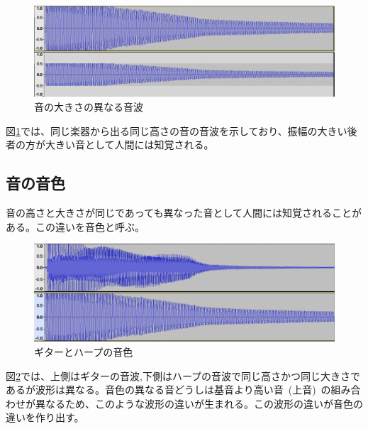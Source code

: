 \begin{figure}[t]
\begin{center}
\includegraphics[width=0.7\hsize]{figure/c4_harp_loudness.png}
\caption{音の大きさの異なる音波}
\label{fig:loudness}
\end{center}
\end{figure}

図\ref{fig:loudness}では、同じ楽器から出る同じ高さの音の音波を示しており、振幅の大きい後者の方が大きい音として人間には知覚される。

\subsection{音の音色}

音の高さと大きさが同じであっても異なった音として人間には知覚されることがある。この違いを音色と呼ぶ。

\begin{figure}[t]
\begin{center}
\includegraphics[width=0.7\hsize]{figure/c4_guitar_harp.png}
\caption{ギターとハープの音色}
\label{fig:guitar_harp_comp}
\end{center}
\end{figure}

図\ref{fig:guitar_harp_comp}では、上側はギターの音波,下側はハープの音波で同じ高さかつ同じ大きさであるが波形は異なる。音色の異なる音どうしは基音より高い音~(上音)~の組み合わせが異なるため、このような波形の違いが生まれる。この波形の違いが音色の違いを作り出す。
